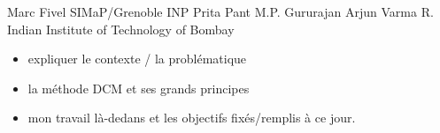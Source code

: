 Marc Fivel SIMaP/Grenoble INP
Prita Pant
M.P. Gururajan
Arjun Varma R. Indian Institute of Technology of Bombay

\begin{itemize}
\item expliquer le contexte / la problématique
\item la méthode DCM et ses grands principes
\item mon travail là-dedans et les objectifs fixés/remplis à ce jour.
\end{itemize}

